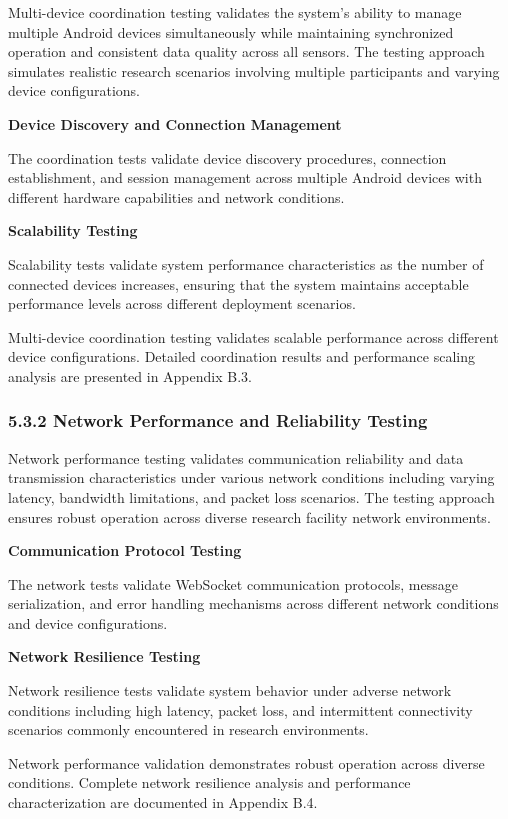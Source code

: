 \documentclass[12pt,a4paper]{article}
\begin{document}
Multi-device coordination testing validates the system's ability to manage multiple Android devices simultaneously while
maintaining synchronized operation and consistent data quality across all sensors. The testing approach simulates
realistic research scenarios involving multiple participants and varying device configurations.

\textbf{Device Discovery and Connection Management}

The coordination tests validate device discovery procedures, connection establishment, and session management across
multiple Android devices with different hardware capabilities and network conditions.

\textbf{Scalability Testing}

Scalability tests validate system performance characteristics as the number of connected devices increases, ensuring
that the system maintains acceptable performance levels across different deployment scenarios.

Multi-device coordination testing validates scalable performance across different device configurations. Detailed
coordination results and performance scaling analysis are presented in Appendix B.3.

\subsubsection{5.3.2 Network Performance and Reliability Testing}

Network performance testing validates communication reliability and data transmission characteristics under various
network conditions including varying latency, bandwidth limitations, and packet loss scenarios. The testing approach
ensures robust operation across diverse research facility network environments.

\textbf{Communication Protocol Testing}

The network tests validate WebSocket communication protocols, message serialization, and error handling mechanisms
across different network conditions and device configurations.

\textbf{Network Resilience Testing}

Network resilience tests validate system behavior under adverse network conditions including high latency, packet loss,
and intermittent connectivity scenarios commonly encountered in research environments.

Network performance validation demonstrates robust operation across diverse conditions. Complete network resilience
analysis and performance characterization are documented in Appendix B.4.
\end{document}
